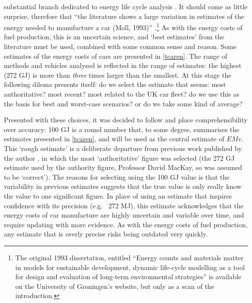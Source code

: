 substantial branch dedicated to energy life cycle analysis \citep{kuemmel1997life,
cornelissen2002value}. It should come as little surprise, therefore that
``the literature shows a large variation in estimates of the energy needed to
manufacture a car (Moll, 1993)''
\citep[p.139]{Wee2000}.\footnote{The original 1993 dissertation, entitled
``Energy counts and materials matter in models for sustainable development,
dynamic life-cycle modelling as a tool for design and evaluation of long-term
environmental strategies'' is available on the University of Groningen's
website, but only as a scan of the introduction.
}
As with the energy
costs of fuel production, this is an uncertain science, and `best estimates'
from the literature must be used, combined with some common
sense and reason. Some estimates of the energy costs of cars are presented in
\cref{tcaren}. The range of methods and vehicles analysed is reflected in
the range of estimates: the highest (272 GJ) is more than \emph{three} times
larger than the smallest. At this stage the following dilema presents itself:
do we select the estimate that seems: most authoritative? most recent?
most related to the UK car fleet? do we use this as the basis for best
and worst-case scenarios? or do we take some kind of average?

Presented with these choices, it was decided to follow \citet{MacKay2009} and
place comprehensibility over accuracy: 100 GJ is a round number
that, to some degree, summarises the estimates presented in
\cref{tcaren}, and will be used as the central estimate of $EMv$.
This `rough estimate' is a deliberate
departure from previous work published by the author
\citep{Lovelace2011-assessing}, in which the most
`authoritative' figure was selected (the 272 GJ estimate used by the
authority figure, Professor David MacKay, so was assumed to be
`correct'). The reasons for selecting using the 100 GJ value is that the
variability in previous estimates suggests that the true value is
only really know the value to one significant figure. In place of using an
estimate that inspires confidence with its precision (e.g.~ 272 MJ),
this estimate acknowledges that the energy costs of car manufacture are highly
uncertain and variable over time, and require updating with more evidence. As
with the energy costs of fuel production, any estimate that is overly precise
risks being outdated very quickly.

